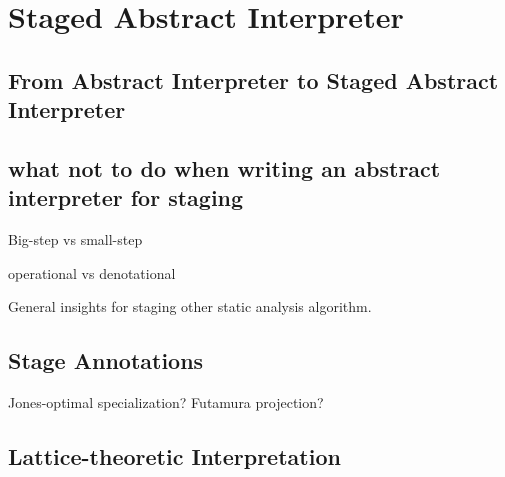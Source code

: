 \section{Staged Abstract Interpreter}

\subsection{From Abstract Interpreter to Staged Abstract Interpreter}

\subsection{what not to do when writing an abstract interpreter for staging}

Big-step vs small-step

operational vs denotational

General insights for staging other static analysis algorithm.

\cite{10.1007/3-540-61580-6_11}

\subsection{Stage Annotations}

Jones-optimal specialization?
Futamura projection?

\subsection{Lattice-theoretic Interpretation}
